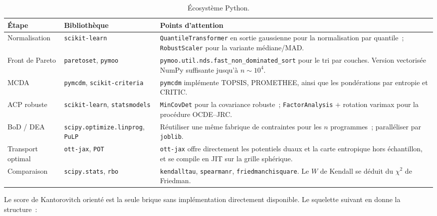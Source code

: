 \documentclass[11pt,a4paper]{article}
\theoremstyle{definition}
\theoremstyle{remark}
\begin{document}
\begin{table}[htbp]
\centering
\small
\renewcommand{\arraystretch}{1.25}
\begin{tabularx}{\textwidth}{@{}l l X@{}}
\toprule
\textbf{Étape} & \textbf{Bibliothèque} & \textbf{Points d'attention} \\
\midrule
Normalisation & \texttt{scikit-learn} &
\texttt{QuantileTransformer} en sortie gaussienne pour la normalisation par quantile~; \texttt{RobustScaler} pour la variante médiane/MAD. \\
Front de Pareto & \texttt{paretoset}, \texttt{pymoo} &
\texttt{pymoo.util.nds.fast\_non\_dominated\_sort} pour le tri par couches. Version vectorisée
NumPy suffisante jusqu'à $n \sim 10^4$. \\
MCDA & \texttt{pymcdm}, \texttt{scikit-criteria} &
\texttt{pymcdm} implémente TOPSIS, PROMETHEE, ainsi que les pondérations par entropie et CRITIC. \\
ACP robuste & \texttt{scikit-learn}, \texttt{statsmodels} &
\texttt{MinCovDet} pour la covariance robuste~; \texttt{FactorAnalysis} $+$ rotation varimax pour
la procédure OCDE--JRC. \\
BoD / DEA & \texttt{scipy.optimize.linprog}, \texttt{PuLP} &
Réutiliser une même fabrique de contraintes pour les $n$ programmes~; paralléliser par
\texttt{joblib}. \\
Transport optimal & \texttt{ott-jax}, \texttt{POT} &
\texttt{ott-jax} offre directement les potentiels duaux et la carte entropique hors échantillon,
et se compile en JIT sur la grille sphérique. \\
Comparaison & \texttt{scipy.stats}, \texttt{rbo} &
\texttt{kendalltau}, \texttt{spearmanr}, \texttt{friedmanchisquare}. Le $W$ de Kendall se déduit
du $\chi^2$ de Friedman. \\
\bottomrule
\end{tabularx}
\caption{Écosystème Python.}
\end{table}

\noindent
Le score de Kantorovitch orienté est la seule brique sans implémentation directement disponible.
Le squelette suivant en donne la structure~:
\end{document}
